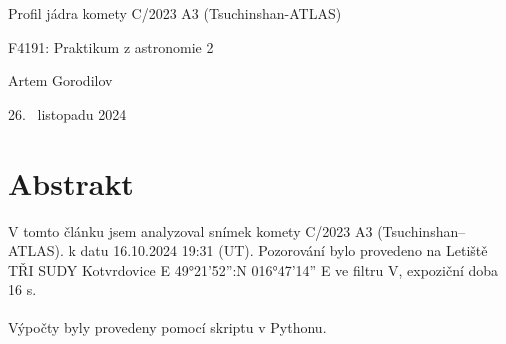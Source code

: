 \documentclass[a4paper,11pt]{article}
\begin{document}
\noindent\hrulefill 
\begin{center}
\bigskip
\huge Profil jádra komety C/2023 A3 (Tsuchinshan-ATLAS)
\vspace{0.2cm}
\par \large F4191: Praktikum z astronomie 2
\par \large Artem Gorodilov
\vspace{0.2cm}
\par \large 26. ~listopadu 2024
\bigskip
\end{center}
\noindent\hrulefill 
\bigskip

\vskip10pt
    \begin{minipage}[t]{0.5\textwidth} 
        \section{Abstrakt}    
            V tomto článku jsem analyzoval snímek komety C/2023 A3 (Tsuchinshan–ATLAS). k datu 16.10.2024 19:31 (UT). Pozorování bylo provedeno na Letiště TŘI SUDY Kotvrdovice E 49°21'52'':N 016°47'14'' E ve filtru V, expoziční doba 16 s.
            \par Výpočty byly provedeny pomocí skriptu v Pythonu\textsuperscript{\cite{github}}.


\end{minipage}
\end{document}
